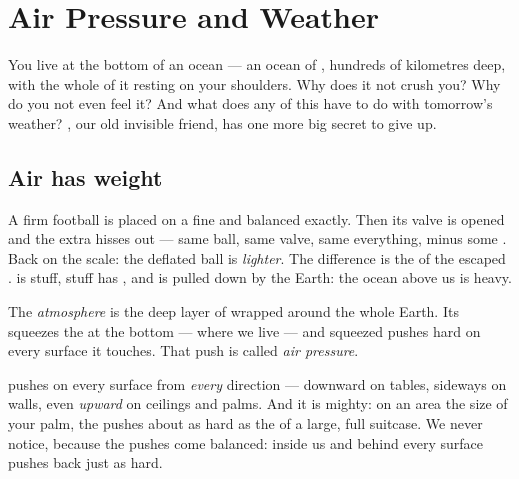 \chapter{Air Pressure and Weather}\label{ch:g5:air-pressure-weather}

You live at the bottom of an ocean --- an ocean of , hundreds of
kilometres deep, with the whole  of it resting on your
shoulders. Why does it not crush you? Why do you not even feel it?
And what does any of this have to do with tomorrow's weather? ,
our old invisible friend, has one more big secret to give up.

\section{Air has weight}

\begin{example}\label{ex:g5:air-pressure-weather:weighing}
A firm football is placed on a fine  and balanced
exactly. Then its valve is opened and the extra  hisses out ---
same ball, same valve, same everything, minus some . Back on the
scale: the deflated ball is \emph{lighter}. The difference is the
 of the escaped .  is stuff, stuff has , and 
is pulled down by the Earth: the ocean above us is heavy.
\end{example}

\begin{definition}\label{def:g5:air-pressure-weather:pressure}
The \emph{atmosphere} is the deep layer of 
wrapped around the whole Earth. Its  squeezes the  at the
bottom --- where we live --- and squeezed  pushes hard on every
surface it touches. That push is called \emph{air
pressure}.
\end{definition}

\begin{proposition}\label{prop:g5:air-pressure-weather:allsides}
 pushes on every surface from \emph{every} direction
--- downward on tables, sideways on walls, even \emph{upward} on
ceilings and palms. And it is mighty: on an area the size of your
palm, the  pushes about as hard as the  of a large,
full suitcase. We never notice, because the pushes come balanced:
 inside us and behind every surface pushes back just as hard.
\end{proposition}

